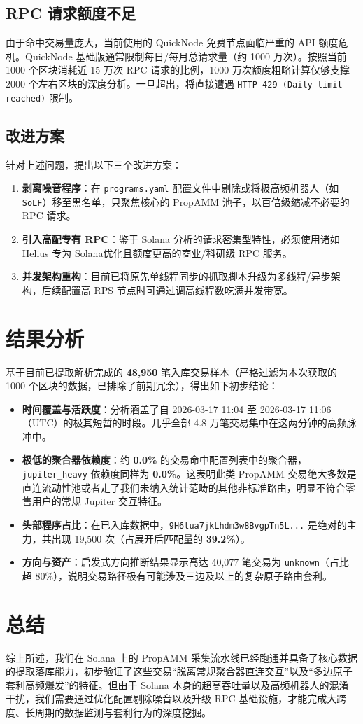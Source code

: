 \documentclass[a4paper,12pt]{article}
\begin{document}
\subsection{RPC 请求额度不足}
由于命中交易量庞大，当前使用的 QuickNode 免费节点面临严重的 API 额度危机。QuickNode 基础版通常限制每日/每月总请求量（约 1000 万次）。按照当前 1000 个区块消耗近 15 万次 RPC 请求的比例，1000 万次额度粗略计算仅够支撑 2000 个左右区块的深度分析。一旦超出，将直接遭遇 \texttt{HTTP 429 (Daily limit reached)} 限制。

\subsection{改进方案}
针对上述问题，提出以下三个改进方案：
\begin{enumerate}
    \item \textbf{剥离噪音程序}：在 \texttt{programs.yaml} 配置文件中剔除或将极高频机器人（如 \texttt{SoLF}）移至黑名单，只聚焦核心的 PropAMM 池子，以百倍级缩减不必要的 RPC 请求。
    \item \textbf{引入高配专有 RPC}：鉴于 Solana 分析的请求密集型特性，必须使用诸如 Helius 专为 Solana优化且额度更高的商业/科研级 RPC 服务。
    \item \textbf{并发架构重构}：目前已将原先单线程同步的抓取脚本升级为多线程/异步架构，后续配置高 RPS 节点时可通过调高线程数吃满并发带宽。
\end{enumerate}

\section{结果分析}
基于目前已提取解析完成的 \textbf{48,950} 笔入库交易样本（严格过滤为本次获取的 1000 个区块的数据，已排除了前期冗余），得出如下初步结论：
\begin{itemize}
    \item \textbf{时间覆盖与活跃度}：分析涵盖了自 2026-03-17 11:04 至 2026-03-17 11:06（UTC）的极其短暂的时段。几乎全部 4.8 万笔交易集中在这两分钟的高频脉冲中。
    \item \textbf{极低的聚合器依赖度}：约 \textbf{0.0\%} 的交易命中配置列表中的聚合器，\texttt{jupiter\_heavy} 依赖度同样为 \textbf{0.0\%}。这表明此类 PropAMM 交易绝大多数是直连流动性池或者走了我们未纳入统计范畴的其他非标准路由，明显不符合零售用户的常规 Jupiter 交互特征。
    \item \textbf{头部程序占比}：在已入库数据中，\texttt{9H6tua7jkLhdm3w8BvgpTn5L...} 是绝对的主力，共出现 19,500 次（占展开后匹配量的 \textbf{39.2\%}）。
    \item \textbf{方向与资产}：启发式方向推断结果显示高达 40,077 笔交易为 \texttt{unknown}（占比超 80\%），说明交易路径极有可能涉及三边及以上的复杂原子路由套利。
\end{itemize}

\section{总结}
综上所述，我们在 Solana 上的 PropAMM 采集流水线已经跑通并具备了核心数据的提取落库能力，初步验证了这些交易“脱离常规聚合器直连交互”以及“多边原子套利高频爆发”的特征。但由于 Solana 本身的超高吞吐量以及高频机器人的混淆干扰，我们需要通过优化配置剔除噪音以及升级 RPC 基础设施，才能完成大跨度、长周期的数据监测与套利行为的深度挖掘。
\end{document}
